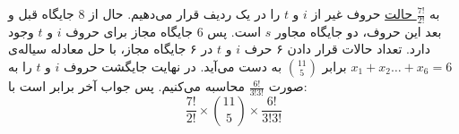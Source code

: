 \p
به
\underline{$\frac{7!}{2!}$ حالت}  
 حروف غیر از $i$ و $t$ 
 را در یک ردیف قرار می‌دهیم. حال از 8 جایگاه قبل و بعد این حروف، دو جایگاه مجاور
  $s$ 
  است. پس 6 جایگاه مجاز برای حروف 
  $i$ و $t$ وجود دارد.
 تعداد حالات قرار دادن ۶ حرف 
$i$ و $t$
 ‌‌در ۶ جایگاه مجاز، با حل معادله سیاله‌ی
 $x_1 + x_2 \ldots + x_6 = 6$
برابر  
 \underline{$\binom{11}{5}$}
به دست می‌آید.
در نهایت جایگشت حروف 
$i$ و $t$ 
را 
به صورت 
\underline{$\frac{6!}{3!3!}$}
محاسبه می‌کنیم.
پس جواب آخر برابر است با:
$$\frac{7!}{2!}\times\binom{11}{5}\times\frac{6!}{3!3!}$$
